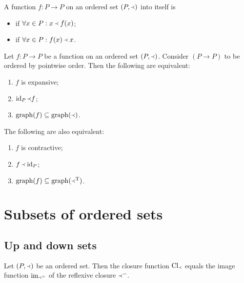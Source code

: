 \begin{definition}
A function $f: P\to P$ on an ordered set $(P,\Yleft)$ into itself is
\begin{itemize}
\item {} if $\forall x\in P: x\Yleft f(x)$;
\item {} if $\forall x\in P: f(x)\Yleft x$.
\end{itemize}
\end{definition}

\begin{lemma}
Let $f:P\to P$ be a function on an ordered set $(P,\Yleft)$. Consider $(P\to P)$ to be ordered by pointwise order. Then the following are equivalent:
\begin{enumerate}
\item $f$ is expansive;
\item $\operatorname{id}_P \Yleft f$;
\item $\operatorname{graph}(f) \subseteq \operatorname{graph}(\Yleft)$.
\end{enumerate}
The following are also equivalent:
\begin{enumerate}
\item $f$ is contractive;
\item $f \Yleft \operatorname{id}_P$;
\item $\operatorname{graph}(f) \subseteq \operatorname{graph}(\Yleft^{\mathrm{T}})$.
\end{enumerate}
\end{lemma}


\section{Subsets of ordered sets}
\subsection{Up and down sets}
\begin{lemma} \label{imageClosureTransitiveRelations}
Let $\sSet{P, \Yleft}$ be an ordered set. Then the closure function $\operatorname{Cl}_{\Yleft}$ equals the image function $\operatorname{im}_{\Yleft^=}$ of the reflexive closure $\Yleft^=$.
\end{lemma}

